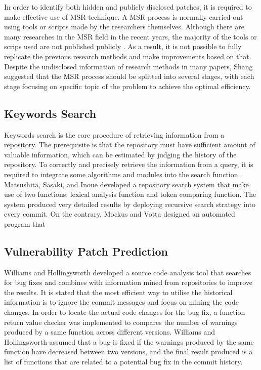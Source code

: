 \documentclass[12pt, a4paper]{report}
\begin{document}
{In order to identify both hidden and publicly disclosed patches, it is required to make effective
use of MSR technique. A MSR process is normally carried out using tools or scripts made by the
researchers themselves. Although there are many researches in the MSR field in the recent years, the
majority of the tools or scrips used are not published publicly \cite{robles_2010}. As a result, it
is not possible to fully replicate the previous research methods and make improvements based on
that. Despite the undisclosed information of research methods in many papers, Shang
\cite{shang_2009} suggested that the MSR process should be splitted into several stages, with each
stage focusing on specific topic of the problem to achieve the optimal efficiency.

\subsection{Keywords Search}
Keywords search is the core procedure of retrieving information from a repository. The prerequisite
is that the repository must have sufficient amount of valuable information, which can be estimated
by judging the history of the repository. To correctly and precisely retrieve the information from a
query, it is required to integrate some algorithms and modules into the search function.
Matsushita, Sasaki, and Inoue \cite{matsushita_2005} developed a repository search system
that make use of two functions: lexical analysis function and token comparing function. The system
produced very detailed results by deploying recursive search strategy into every commit. On the
contrary, Mockus and Votta \cite{mockus_2000} designed an automated program that

\subsection{Vulnerability Patch Prediction}
Williams and Hollingsworth \cite{williams_2005} developed a source code analysis tool that searches
for bug fixes and combines with information mined from repositories to improve the results. It is
stated that the most efficient way to utilise the historical information is to ignore the commit
messages and focus on mining the code changes. In order to locate the actual code changes for the
bug fix, a function return value checker was implemented to compares the number of warnings produced
by a same function across different versions. Williams and Hollingsworth assumed that a bug is fixed
if the warnings produced by the same function have decreased between two versions, and the final
result produced is a list of functions that are related to a potential bug fix in the commit
history.

}
\end{document}

